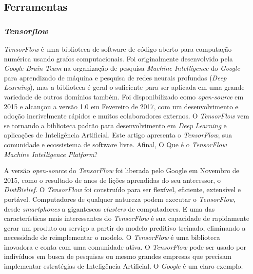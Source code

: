 \subsection{Ferramentas}

\subsubsection{\textit{Tensorflow}}

\textit{TensorFlow} é uma biblioteca de software de código aberto para computação numérica usando grafos computacionais. Foi originalmente desenvolvido pela \textit{Google Brain Team} na organização de pesquisa \textit{Machine Intelligence} do \textit{Google} para aprendizado de máquina e pesquisa de redes neurais profundas (\textit{Deep Learning}), mas a biblioteca é geral o suficiente para ser aplicada em uma grande variedade de outros domínios também. Foi disponibilizado como \textit{open-source} em 2015 e alcançou a versão 1.0 em Fevereiro de 2017, com um desenvolvimento e adoção incrivelmente rápidos e muitos colaboradores externos. O \textit{TensorFlow} vem se tornando a biblioteca padrão para desenvolvimento em \textit{Deep Learning} e aplicações de Inteligência Artificial. Este artigo apresenta o \textit{TensorFlow}, sua comunidade e ecossistema de software livre. Afinal, O Que é o \textit{TensorFlow Machine Intelligence Platform}?

A versão \textit{open-source} do \textit{TensorFlow} foi liberada pelo Google em Novembro de 2015, como o resultado de anos de lições aprendidas do seu antecessor, o \textit{DistBielief}. O \textit{TensorFlow} foi construído para ser flexível, eficiente, extensível e portável. Computadores de qualquer natureza podem executar o \textit{TensorFlow}, desde \textit{smartphones} a gigantescos \textit{clusters} de computadores. E uma das características mais interessantes do \textit{TensorFlow} é sua capacidade de rapidamente gerar um produto ou serviço a partir do modelo preditivo treinado, eliminando a necessidade de reimplementar o modelo. O \textit{TensorFlow} é uma biblioteca inovadora e conta com uma comunidade ativa. O \textit{TensorFlow} pode ser usado por indivíduos em busca de pesquisas ou mesmo grandes empresas que precisam implementar estratégias de Inteligência Artificial. O \textit{Google} é um claro exemplo.

